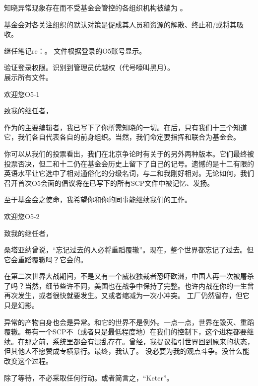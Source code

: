 
\begin{whiteboxbb}

知晓异常现象存在而不受基金会管控的各组织机构被编为 。

基金会对各关注组织的默认对策是促成其人员和资源的解散、终止和/或将其吸收。

\end{whiteboxbb}

继任笔记re：。 文件根据登录的O5账号显示。


\begin{scpboxc}[colback=dafadnine]

验证登录权限。识别到管理员优越权（代号嚎叫黑月）。\\
展示所有文件。

\end{scpboxc}


\begin{scpbox}

欢迎您O5-1

致我的继任者，

作为的主要编辑者，我已写下了你所需知晓的一切。在后，只有我们十三个知道它，我们各自代表各自的前身组织。当然，我们命定要指挥和联合为基金会。

你可以从我们的投票看出，我们在北京争论时有关于的另外两种版本。它们最终被投票否决，但二和十二仍在基金会历史上留下了自己的记号。遗憾的是十二有限的英语水平让它选中了相对通俗化的分级名词，与二和我刚好相对。无论如何，我们召开首次O5会面的倡议将在已写下的所有SCP文件中被记忆、发扬。

至于基金会之使命，我希望你和你的同事能继续我们的工作。

\end{scpbox}

\begin{scpbox}

欢迎您O5-2

致我的继任者，

桑塔亚纳曾说，“忘记过去的人必将重蹈覆辙”。现在，整个世界都忘记了过去。但它会重蹈覆辙吗？它会的。

在第二次世界大战期间，不是又有一个威权独裁者恐吓欧洲，中国人再一次被屠杀了吗？当然，细节些许不同，美国也在战争中保持了完整。也许内战在你的一生曾再次发生，或者很快就要发生。又或者缩减为一次小冲突。 工厂仍然留存，但它只是幻影。

异常的产物自身也会是异常。和它的世界不是例外。一点一点，世界在毁灭、重蹈覆辙。每有一个SCP不（或者只是最低程度地）在我们的控制下，这个进程都要继续。在那之前，系统里都会有混乱存在。曾经，我提议指引世界回到原来的状态，但其他人不愿赞成专横暴行。最终，我认了。 没必要为我的观点斗争。没什么能改变这个过程。

除了等待，不必采取任何行动。或者简言之，“Keter”。

\end{scpbox}

